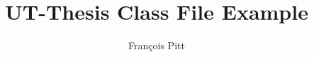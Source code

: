 \documentclass[narrowmargins,12pt,twoside,draft]{fcup-thesis}
\author{Fran\c{c}ois Pitt}
\title{UT-Thesis Class File Example}
\theoremstyle{plain}
\theoremstyle{plain}
\theoremstyle{remark}
\begin{document}
\begin{preliminary}

\maketitle

\cleardoublepage


\begin{dedication}
\lipsum[1]
\end{dedication}

\begin{acknowledgements}
\lipsum[1-2]
\end{acknowledgements}



\begin{abstract}
\lipsum[2]
\end{abstract}

\begin{abstract-pt}
\lipsum[2]
\end{abstract-pt}





\tableofcontents

\listoftables

\listoffigures

\listofalgorithms

\newpage

\end{preliminary}
\end{document}
